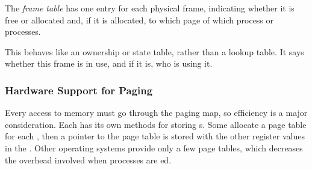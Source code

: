 \begin{definition}\label{def:Frame_Table}
  The \emph{frame table} has one entry for each physical frame, indicating whether it is free or allocated and, if it is allocated, to which page of which process or processes.

  This behaves like an ownership or state table, rather than a lookup table.
  It says whether this frame is in use, and if it is, who is using it.
\end{definition}

\subsubsection{Hardware Support for Paging}\label{subsubsec:Paging_Hardware_Support}
Every access to memory must go through the paging map, so efficiency is a major consideration.
Each  has its own methods for storing s.
Some allocate a page table for each , then a pointer to the page table is stored with the other register values in the .
Other operating systems provide only a few page tables, which decreases the overhead involved when processes are ed.

